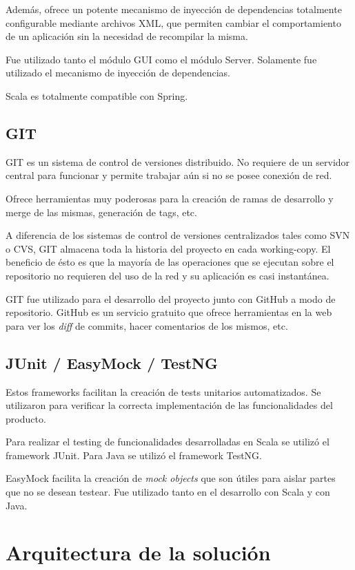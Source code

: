 \documentclass[12pt,a4paper]{article}
\let\stdsection\section
\renewcommand\section{\newpage\stdsection}
\begin{document}
Además, ofrece un potente mecanismo de inyección de dependencias totalmente configurable mediante archivos XML, que
permiten cambiar el comportamiento de un aplicación sin la necesidad de recompilar la misma.

Fue utilizado tanto el módulo GUI como el módulo Server. Solamente fue utilizado el mecanismo de inyección
de dependencias.

Scala es totalmente compatible con Spring.

\subsection{GIT}
GIT es un sistema de control de versiones distribuido. No requiere de un servidor central para funcionar y permite
trabajar aún si no se posee conexión de red.

Ofrece herramientas muy poderosas para la creación de ramas de desarrollo y merge de las mismas, generación de tags, etc.

A diferencia de los sistemas de control de versiones centralizados tales como SVN o CVS, GIT almacena toda la historia
del proyecto en cada working-copy. El beneficio de ésto es que la mayoría de las operaciones que se ejecutan sobre
el repositorio no requieren del uso de la red y su aplicación es casi instantánea.

GIT fue utilizado para el desarrollo del proyecto junto con GitHub \cite{github} a modo de repositorio. GitHub es un servicio
gratuito que ofrece herramientas en la web para ver los \textit{diff} de commits, hacer comentarios de los mismos, etc.

\subsection{JUnit \cite{junit} / EasyMock \cite{easymock} / TestNG \cite{testng} }
Estos frameworks facilitan la creación de tests unitarios automatizados. Se utilizaron para verificar la correcta
implementación de las funcionalidades del producto.

Para realizar el testing de funcionalidades desarrolladas en Scala se utilizó el framework JUnit. Para Java se utilizó
el framework TestNG.

EasyMock facilita la creación de \textit{mock objects} \cite{mocks} que son útiles para aislar partes que no se desean
testear. Fue utilizado tanto en el desarrollo con Scala y con Java.

\section{Arquitectura de la solución}
\end{document}
